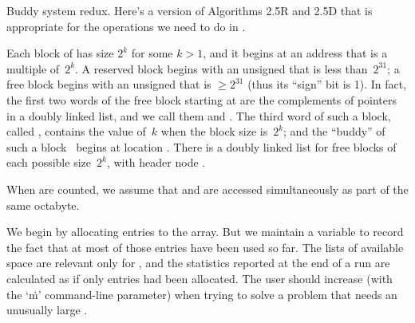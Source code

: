 Buddy system redux. Here's a version of Algorithms 2.5R
and 2.5D that
is appropriate for the operations we need to do in .

Each block of  has size $2^k$ for some $k>1$, and it begins at
an address that is a multiple of~$2^k$. A reserved block begins with
an unsigned  that is less than~$2^{31}$; a free block begins with
an unsigned  that is $\ge2^{31}$ (thus its ``sign'' bit is 1).
In fact, the first two words of the free block starting at  are
the complements of pointers in a doubly linked list, and we call them
 and . The third word of such a block, called ,
contains the value of~$k$ when the block size is~$2^k$; and the
``buddy'' of such a block~ begins at location .
There is a doubly linked list for free blocks of
each possible size~$2^k$, with header node .

When  are counted, we assume that  and  are
accessed simultaneously as part of the same octabyte.

We begin by allocating  entries to the 
array.
But we maintain a variable  to record the fact that
at most  of those entries have been used so far.
The lists of available space are relevant only for ,
and the statistics reported at the end of a run are calculated
as if only  entries had been allocated. The user should
increase  (with the `\.m' command-line parameter) when trying
to
solve a problem that needs an unusually large .

